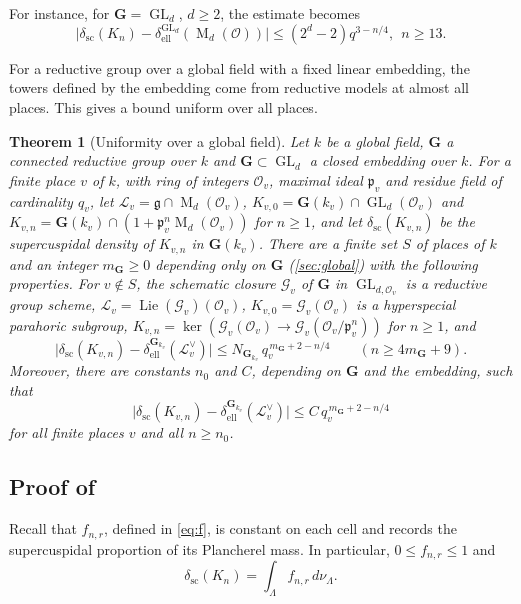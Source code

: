 \documentclass[11pt,reqno]{amsart}
\numberwithin{equation}{section}
\theoremstyle{plain}
\newtheorem{theorem}{Theorem}[section]
\theoremstyle{definition}
\theoremstyle{remark}
\theoremstyle{plain}
\newcommand{\OO}{\mathcal{O}}    %
\newcommand{\pp}{\mathfrak{p}}   %
\newcommand{\Lat}{\mathcal{L}}   %
\newcommand{\dLat}{\Lambda}      %
\newcommand{\bG}{\mathbf{G}}     %
\newcommand{\g}{\mathfrak{g}}    %
\newcommand{\gd}{\mathfrak{g}^*} %
\newcommand{\scd}[1]{\delta_{\mathrm{sc}}(#1)}
\newcommand{\elld}[2][]{\delta_{\mathrm{ell}}^{#1}(#2)}  %
\newcommand{\cG}{\mathcal{G}}                   %
\newcommand{\abs}[1]{\lvert#1\rvert}
\DeclareMathOperator{\Lie}{Lie}
\DeclareMathOperator{\GL}{GL}
\DeclareMathOperator{\Mat}{M}
\begin{document}
For instance, for $\bG=\GL_d$, $d\ge2$, the estimate becomes
\[
\abs{\scd{K_n}-\elld[\GL_d]{\Mat_d(\OO)}}\le(2^d-2)q^{3-n/4},\ \ n\ge13.
\]

For a reductive group over a global field with a fixed linear embedding, the
towers defined by the embedding come from reductive models at almost all
places. This gives a bound uniform over all places.

\begin{theorem}[Uniformity over a global field]\label{thm:global}
Let $k$ be a global field, $\bG$ a connected reductive group over $k$ and
$\bG\subset\GL_d$ a closed embedding over $k$. For a finite place $v$ of $k$, with ring of integers $\OO_v$, maximal ideal $\pp_v$
and residue field of cardinality $q_v$, let $\Lat_v=\g\cap\Mat_d(\OO_v)$,
$K_{v,0}=\bG(k_v)\cap\GL_d(\OO_v)$ and
$K_{v,n}=\bG(k_v)\cap(1+\pp_v^n\Mat_d(\OO_v))$ for $n\ge1$, and let $\scd{K_{v,n}}$ be
the supercuspidal density of $K_{v,n}$ in $\bG(k_v)$. There are a finite set
$S$ of places of $k$ and an integer $m_{\bG}\ge0$ depending only on $\bG$
(\cref{sec:global}) with the following properties. For $v\notin S$, the
schematic closure $\cG_v$ of $\bG$ in $\GL_{d,\OO_v}$ is a reductive group
scheme, $\Lat_v=\Lie(\cG_v)(\OO_v)$, $K_{v,0}=\cG_v(\OO_v)$ is a hyperspecial
parahoric subgroup, $K_{v,n}=\ker(\cG_v(\OO_v)\to\cG_v(\OO_v/\pp_v^n))$ for
$n\ge1$, and
\begin{equation}\label{eq:globalgood}
\bigl|\scd{K_{v,n}}-\elld[\bG_{k_v}]{\Lat_v^\vee}\bigr|\le N_{\bG_{k_v}}\,q_v^{\,m_{\bG}+2-n/4}
\qquad(n\ge4m_{\bG}+9).
\end{equation}
Moreover, there are constants $n_0$ and $C$, depending on $\bG$ and the embedding, such that
\begin{equation}\label{eq:globalall}
\bigl|\scd{K_{v,n}}-\elld[\bG_{k_v}]{\Lat_v^\vee}\bigr|\le C\,q_v^{\,m_{\bG}+2-n/4}
\end{equation}
for all finite places $v$ and all $n\ge n_0$.
\end{theorem}


\subsection{Proof of }\label{sec:proofsgeneral}

Recall that $f_{n,r}$, defined in \eqref{eq:f}, is constant on each
cell and records the supercuspidal proportion of its Plancherel mass.
In particular, $0\le f_{n,r}\le1$ and
\[
\scd{K_n}=\int_\dLat f_{n,r}\,d\nu_{\dLat}.
\]
\end{document}
